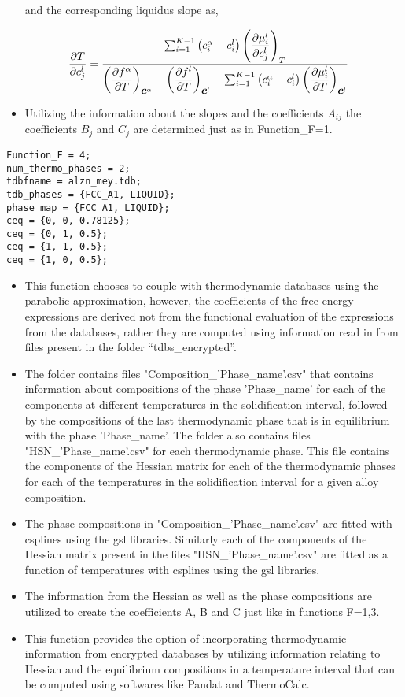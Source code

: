 \documentclass[a4paper,10pt]{article}
\newcommand{\vc}{\mbox{\boldmath{$c$}}}
\begin{document}
\begin{itemize}
 and the corresponding liquidus slope as, 
 
 \begin{align*}
  \dfrac{\partial T}{\partial c_j^{l}} &=  \dfrac{\sum_{i=1}^{K-1} \left(c_i^{\alpha} - c_i^{l}\right)\left(\dfrac{\partial \mu_i^{l}}{\partial c_j^{l}}\right)_T}{\left(\dfrac{\partial f^{\alpha}}{\partial T}\right)_{\vc^{\alpha}} 
  - \left(\dfrac{\partial f^l}{\partial T}\right)_{\vc^{l}} -  \sum_{i=1}^{K-1}\left(c_i^{\alpha} - c_i^{l}\right)\left(\dfrac{\partial \mu_i^{l}}{\partial T}\right)_{\vc^{l}}}
 \end{align*}
 
 \item Utilizing the information about the slopes and the coefficients $A_{ij}$ the coefficients $B_j$ and $C_j$ are determined just as in Function\_F=1.
\end{itemize}

\begin{lstlisting}
Function_F = 4;
num_thermo_phases = 2;
tdbfname = alzn_mey.tdb;
tdb_phases = {FCC_A1, LIQUID};
phase_map = {FCC_A1, LIQUID};
ceq = {0, 0, 0.78125};
ceq = {0, 1, 0.5};
ceq = {1, 1, 0.5};
ceq = {1, 0, 0.5};
\end{lstlisting}

\begin{itemize}
 \item This function chooses to couple with thermodynamic databases using the parabolic approximation, however, the coefficients of the free-energy expressions are
 derived not from the functional evaluation of the expressions from the databases, rather they are computed using information read in from files present in the 
 folder ``tdbs\_encrypted''.
 \item The folder contains files "Composition\_'Phase\_name'.csv" that contains information about compositions of the phase 'Phase\_name' for each of the components at different 
 temperatures in the solidification interval, followed by the compositions of the last thermodynamic phase that is in equilibrium with the phase 'Phase\_name'.
 The folder also contains files "HSN\_'Phase\_name'.csv" for each thermodynamic phase. This file contains the components of the Hessian matrix for each of the thermodynamic 
 phases for each of the temperatures in the solidification interval for a given alloy composition. 
 \item The phase compositions in "Composition\_'Phase\_name'.csv" are fitted with csplines using the gsl libraries. Similarly each of the components of the Hessian 
 matrix present in the files "HSN\_'Phase\_name'.csv" are fitted as a function of temperatures with csplines using the gsl libraries.
 \item The information from the Hessian as well as the phase compositions are utilized to create the coefficients A, B and C just like in functions F=1,3.
 \item This function provides the option of incorporating thermodynamic information from encrypted databases by utilizing information relating to Hessian and the equilibrium 
 compositions in a temperature interval that can be computed using softwares like Pandat and ThermoCalc.
\end{itemize}
\end{document}
